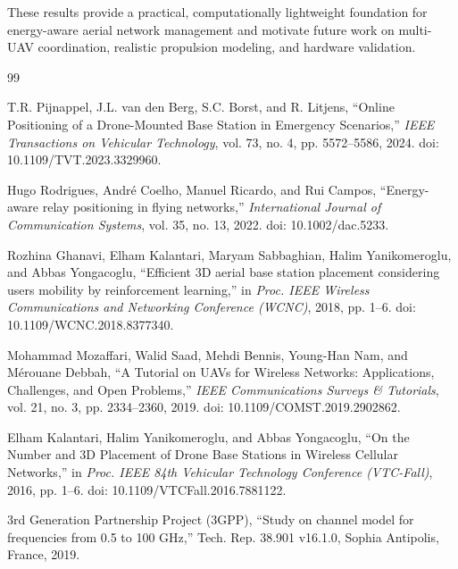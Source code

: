 \documentclass[12pt]{report}
\begin{document}
These results provide a practical, computationally lightweight foundation for energy-aware aerial network management and motivate future work on multi-UAV coordination, realistic propulsion modeling, and hardware validation.

\begin{thebibliography}{99}

T.R. Pijnappel, J.L. van den Berg, S.C. Borst, and R. Litjens,
``Online Positioning of a Drone-Mounted Base Station in Emergency Scenarios,''
\textit{IEEE Transactions on Vehicular Technology},
vol. 73, no. 4, pp. 5572--5586, 2024.
doi: 10.1109/TVT.2023.3329960.

Hugo Rodrigues, André Coelho, Manuel Ricardo, and Rui Campos,
``Energy-aware relay positioning in flying networks,''
\textit{International Journal of Communication Systems},
vol. 35, no. 13, 2022.
doi: 10.1002/dac.5233.

Rozhina Ghanavi, Elham Kalantari, Maryam Sabbaghian,
Halim Yanikomeroglu, and Abbas Yongacoglu,
``Efficient 3D aerial base station placement considering users mobility by reinforcement learning,''
in \textit{Proc. IEEE Wireless Communications and Networking Conference (WCNC)},
2018, pp. 1--6.
doi: 10.1109/WCNC.2018.8377340.

Mohammad Mozaffari, Walid Saad, Mehdi Bennis,
Young-Han Nam, and Mérouane Debbah,
``A Tutorial on UAVs for Wireless Networks: Applications, Challenges, and Open Problems,''
\textit{IEEE Communications Surveys \& Tutorials},
vol. 21, no. 3, pp. 2334--2360, 2019.
doi: 10.1109/COMST.2019.2902862.

Elham Kalantari, Halim Yanikomeroglu, and Abbas Yongacoglu,
``On the Number and 3D Placement of Drone Base Stations in Wireless Cellular Networks,''
in \textit{Proc. IEEE 84th Vehicular Technology Conference (VTC-Fall)},
2016, pp. 1--6.
doi: 10.1109/VTCFall.2016.7881122.

3rd Generation Partnership Project (3GPP),
``Study on channel model for frequencies from 0.5 to 100 GHz,''
Tech. Rep. 38.901 v16.1.0,
Sophia Antipolis, France, 2019.

\end{thebibliography}
\end{document}
